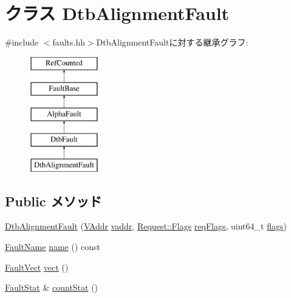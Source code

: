 \hypertarget{classAlphaISA_1_1DtbAlignmentFault}{
\section{クラス DtbAlignmentFault}
\label{classAlphaISA_1_1DtbAlignmentFault}
}


{\ttfamily \#include $<$faults.hh$>$}DtbAlignmentFaultに対する継承グラフ:\begin{figure}[H]
\begin{center}
\leavevmode
\includegraphics[height=5cm]{classAlphaISA_1_1DtbAlignmentFault}
\end{center}
\end{figure}
\subsection*{Public メソッド}
\begin{DoxyCompactItemize}
\item 
\hyperlink{classAlphaISA_1_1DtbAlignmentFault_ad19c673ddedc51c81895670922fff3ce}{DtbAlignmentFault} (\hyperlink{structAlphaISA_1_1VAddr}{VAddr} \hyperlink{classAlphaISA_1_1DtbFault_a48d5190e0fd672e7fe9d248a670b8ea3}{vaddr}, \hyperlink{classFlags}{Request::Flags} \hyperlink{classAlphaISA_1_1DtbFault_a4342a385c094b40ed46b0674fbb0b223}{reqFlags}, uint64\_\-t \hyperlink{classAlphaISA_1_1DtbFault_a899a76dc5f03f0d4ea3793c339e07ee9}{flags})
\item 
\hyperlink{sim_2faults_8hh_abb196df64725e5c2568c900cf130d8d7}{FaultName} \hyperlink{classAlphaISA_1_1DtbAlignmentFault_a73adb23259baf912a81683a9790a303f}{name} () const 
\item 
\hyperlink{classm5_1_1params_1_1Addr}{FaultVect} \hyperlink{classAlphaISA_1_1DtbAlignmentFault_ae15c5d7ab0162821b93d668d0b225198}{vect} ()
\item 
\hyperlink{classStats_1_1Scalar}{FaultStat} \& \hyperlink{classAlphaISA_1_1DtbAlignmentFault_a6c79663c761ff57265459f7e3aefaf4c}{countStat} ()
\end{DoxyCompactItemize}
